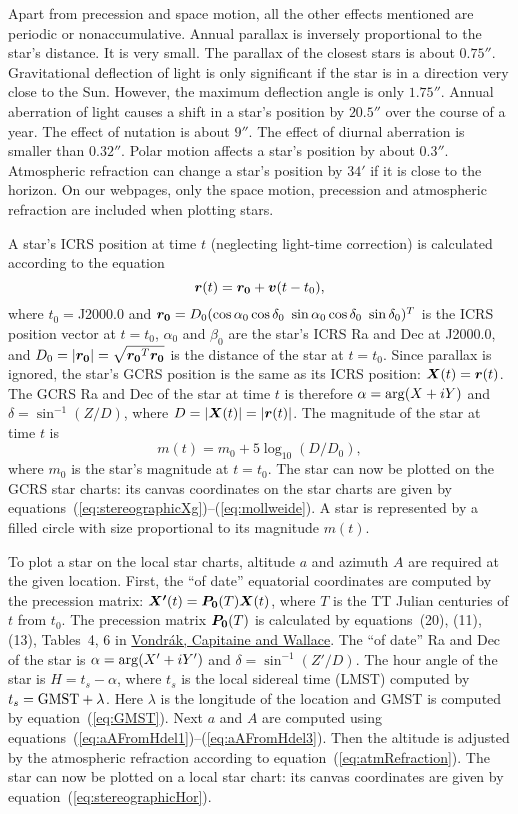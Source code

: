 \documentclass[12pt]{article}
\newcommand \beq {\begin{equation}}
\newcommand \eeq {\end{equation}}
\newcommand{\ve}[1]{\mbox{\boldmath $#1$}}
\begin{document}
Apart from precession and space motion, all the other effects mentioned 
are periodic or nonaccumulative. Annual parallax is 
inversely proportional to the star's distance. It is very small. The parallax 
of the closest stars is about $0.75''$. Gravitational deflection of light is 
only significant if the star is in a direction very close to the Sun. However, 
the maximum deflection angle is only $1.75''$. Annual aberration of light causes a shift 
in a star's position by $20.5''$ over the course of a year. The effect of 
nutation is about $9''$. The effect of diurnal aberration is smaller than $0.32''$. Polar 
motion affects a star's position by about $0.3''$. Atmospheric refraction 
can change a star's position by $34'$ if it is close to the horizon. 
On our webpages, only the space motion, precession and atmospheric 
refraction are included when plotting stars.

A star's ICRS position at time $t$ (neglecting light-time correction) 
is calculated according to the equation 
\beq
  \ve{r}(t) = \ve{r_0} + \ve{v} (t-t_0) ,
\eeq
where $t_0=$J2000.0 and $\ve{r_0} = D_0 (\cos \alpha_0 \cos \delta_0\ 
\sin \alpha_0 \cos \delta_0\ \sin \delta_0)^T$ is the ICRS position 
vector at $t=t_0$, $\alpha_0$ and $\beta_0$ are the star's ICRS Ra and Dec 
at J2000.0, and $D_0=|\ve{r_0}|=\sqrt{\ve{r_0}^T \ve{r_0}}$ is the distance 
of the star at $t=t_0$. Since parallax is ignored, the star's GCRS position 
is the same as its ICRS position: $\ve{X}(t)=\ve{r}(t)$. The GCRS Ra and Dec 
of the star at time $t$ is therefore $\alpha = {\rm arg}(X+iY)$ and 
$\delta = \sin^{-1} (Z/D)$, where $D=|\ve{X}(t)|=|\ve{r}(t)|$. The 
magnitude of the star at time $t$ is 
\beq
  m(t) = m_0 + 5\log_{10}(D/D_0) ,
\eeq
where $m_0$ is the star's magnitude at $t=t_0$. The star can now be 
plotted on the GCRS star charts: its canvas coordinates on the 
star charts are given by equations~(\ref{eq:stereographicXg})--(\ref{eq:mollweide}).  
A star is represented by a filled circle with size proportional to its 
magnitude $m(t)$.

To plot a star on the local star charts, altitude $a$ 
and azimuth $A$ are required at the given location. First, the ``of date'' equatorial 
coordinates are computed by the precession matrix: $\ve{X'}(t)=\ve{P_0}(T)\ve{X}(t)$, 
where $T$ is the TT Julian centuries of $t$ from $t_0$. The precession matrix 
$\ve{P_0}(T)$ is calculated by equations~(20), (11), (13), Tables~4, 6 in
\href{https://ui.adsabs.harvard.edu/abs/2011A%26A...534A..22V/abstract}{Vondr\'ak, Capitaine and Wallace}.
The ``of date'' Ra and Dec 
of the star is $\alpha = {\rm arg}(X'+iY')$ and $\delta=\sin^{-1} (Z'/D)$. 
The hour angle of the star is $H=t_s-\alpha$, where $t_s$ is the local 
sidereal time (LMST) computed by $t_s = {\rm GMST}+\lambda$. 
Here $\lambda$ is the longitude of the location and GMST is computed 
by equation~(\ref{eq:GMST}). Next $a$ and $A$ are computed using 
equations~(\ref{eq:aAFromHdel1})--(\ref{eq:aAFromHdel3}). Then the altitude 
is adjusted by the atmospheric refraction according to equation~(\ref{eq:atmRefraction}). 
The star can now be plotted on a local star chart: its canvas coordinates are 
given by equation~(\ref{eq:stereographicHor}).
\end{document}

